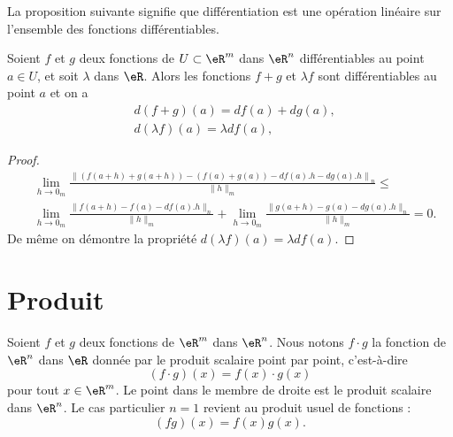 La proposition suivante signifie que différentiation est une opération linéaire sur l'ensemble des fonctions différentiables.
\begin{proposition}		\label{PropDiffLineaire}
	Soient \( f\) et \( g\) deux fonctions de \( U\subset\eR^m\) dans \( \eR^n\) différentiables au point \( a\in U\), et soit \( \lambda\) dans \( \eR\). Alors les fonctions \( f+g\) et \( \lambda f\) sont différentiables au point \( a\) et on a
	\begin{equation}
		\begin{aligned}
			 & d(f+g)(a)=df(a)+dg(a),         \\
			 & d(\lambda f)(a)=\lambda df(a),
		\end{aligned}
	\end{equation}
\end{proposition}
\begin{proof}
	\begin{equation}
		\begin{aligned}
			 & \lim_{h\to 0_m}\frac{\left\|\left(f(a+h)+g(a+h)\right)-\left(f(a)+g(a)\right)-df(a).h-dg(a).h\right\|_n}{\|h\|_m}\leq \\
			 & \lim_{h\to 0_m}\frac{\|f(a+h)-f(a)-df(a).h\|_n}{\|h\|_m}+\lim_{h\to 0_m}\frac{\|g(a+h)-g(a)-dg(a).h\|_n}{\|h\|_m}=0.
		\end{aligned}
	\end{equation}
	De même on démontre la  propriété \( d(\lambda f)(a)=\lambda df(a)\).
\end{proof}

\section{Produit}

Soient \( f\) et \( g\) deux fonctions de \( \eR^m\) dans \( \eR^n\). Nous notons \( f\cdot g\) la fonction de \( \eR^n\) dans \( \eR\) donnée par le produit scalaire point par point, c'est-à-dire
\begin{equation}
	(f\cdot g)(x)=f(x)\cdot g(x)
\end{equation}
pour tout \( x\in\eR^m\). Le point dans le membre de droite est le produit scalaire dans \( \eR^n\). Le cas particulier \( n=1\) revient au produit usuel de fonctions :
\begin{equation}
	(fg)(x)=f(x)g(x).
\end{equation}

